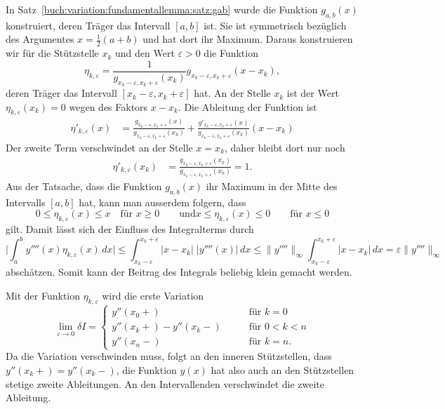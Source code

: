 In Satz~\ref{buch:variation:fundamentallemma:satz:gab} wurde die
Funktion $g_{a,b}(x)$ konstruiert, deren Träger das Intervall
$[a,b]$ ist.
Sie ist symmetrisch bezüglich des Argumentes $x=\frac12(a+b)$
und hat dort ihr Maximum.
Daraus konstruieren wir für die Stützstelle $x_k$ und den Wert
$\varepsilon>0$ die Funktion
\[
\eta_{k,\varepsilon}
=
\frac{1}{g_{x_k-\varepsilon,x_k+\varepsilon}(x_k)}
g_{x_k-\varepsilon,x_k+\varepsilon}
(x-x_k),
\]
deren Träger das Intervall $[x_k-\varepsilon,x_k+\varepsilon]$ hat.
An der Stelle $x_k$ ist der Wert $\eta_{k,\varepsilon}(x_k)=0$
wegen des Faktors $x-x_k$.
Die Ableitung der Funktion ist
\begin{align*}
\eta'_{k,\varepsilon}(x)
&=
\frac{g_{x_k-\varepsilon,x_k+\varepsilon}(x)}{g_{x_k-\varepsilon,x_k+\varepsilon}(x_k)}
+
\frac{g'_{x_k-\varepsilon,x_k+\varepsilon}(x)}{g_{x_k-\varepsilon,x_k+\varepsilon}(x_k)}
(x-x_k)
\end{align*}
Der zweite Term verschwindet an der Stelle $x=x_k$, daher bleibt dort nur noch
\begin{align*}
\eta'_{k,\varepsilon}(x_k)
&=
\frac{
g_{x_k-\varepsilon,x_k+\varepsilon}(x_k)
}{
g_{x_k-\varepsilon,x_k+\varepsilon}(x_k)
}
=
1.
\end{align*}
Aus der Tatsache, dass die Funktion $g_{a,b}(x)$ ihr Maximum in der
Mitte des Intervalls $[a,b]$ hat, kann man ausserdem folgern, dass 
\[
0
\le
\eta_{k,\varepsilon}(x)
\le
x
\quad\text{für $x\ge 0$}
\qquad\text{und}
x\le \eta_{k,\varepsilon}(x)\le 0
\quad
\quad
\text{für $x\le 0$}
\]
gilt.
Damit lässt sich der Einfluss des Integralterms durch
\[
\biggl|
\int_{a}^{b}
y''''(x)\eta_{k,\varepsilon}(x)
\,dx
\biggr|
\le
\int_{x_k-\varepsilon}^{x_k+\varepsilon}
|x-x_k|
\;
|y''''(x)|\,dx
\le
\|y''''\|_{\infty}
\int_{x_k-\varepsilon}^{x_k+\varepsilon}
|x-x_k|\,dx
=
\varepsilon \| y''''\|_{\infty}
\]
abschätzen.
Somit kann der Beitrag des Integrals beliebig klein gemacht werden.

Mit der Funktion $\eta_{k,\varepsilon}$ wird die erste
Variation
\[
\lim_{\varepsilon\to 0}
\delta I
=
\begin{cases}
y''(x_0+)
&\qquad \text{für $k=0$}
\\
y''(x_k+)-y''(x_k-)
&\qquad \text{für $0<k<n$}
\\
y''(x_n-)
&\qquad \text{für $k=n$.}
\end{cases}
\]
Da die Variation verschwinden muss, folgt an den inneren Stützstellen,
dass $y''(x_k+)=y''(x_k-)$, die Funktion $y(x)$ hat also auch an
den Stützstellen stetige zweite Ableitungen.
An den Intervallenden verschwindet die zweite Ableitung.

